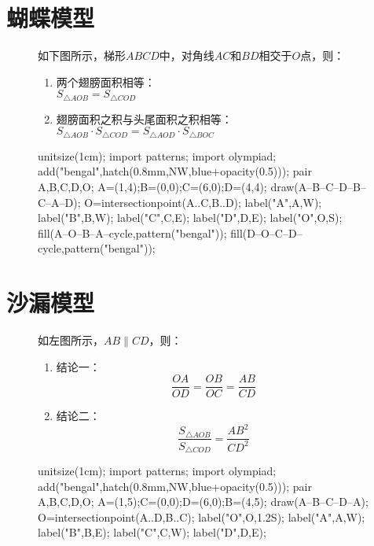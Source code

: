\documentclass[12pt,space]{ctexart} %
\begin{document}
\section{蝴蝶模型}
\begin{figure}[ht]
	\begin{minipage}[b]{0.5\textwidth}
		如下图所示，梯形$ABCD$中，对角线$AC$和$BD$相交于$O$点，则：
		\begin{enumerate}
			\item 两个翅膀面积相等：\\
			      $S_{\triangle AOB}=S_{\triangle COD}$
			\item 翅膀面积之积与头尾面积之积相等：\\
			      $S_{\triangle AOB}\cdot S_{\triangle COD}=S_{\triangle AOD}\cdot S_{\triangle BOC}$
		\end{enumerate}
	\end{minipage}
	\qquad
	\begin{minipage}[b]{0.4\textwidth}
		\begin{asy}
			unitsize(1cm);
			import patterns;
			import olympiad;
			add("bengal",hatch(0.8mm,NW,blue+opacity(0.5)));
			pair A,B,C,D,O;
			A=(1,4);B=(0,0);C=(6,0);D=(4,4);
			draw(A--B--C--D--B--C--A--D);
			O=intersectionpoint(A..C,B..D);
			label("A",A,W);
			label("B",B,W);
			label("C",C,E);
			label("D",D,E);
			label("O",O,S);
			fill(A--O--B--A--cycle,pattern("bengal"));
			fill(D--O--C--D--cycle,pattern("bengal"));
		\end{asy}
	\end{minipage}
\end{figure}
\vspace{1cm}
\section{沙漏模型}
\begin{figure}[ht]
	\begin{minipage}[b]{0.45\textwidth}
		如左图所示，$AB\parallel CD$，则：
		\begin{enumerate}
			\item 结论一：
			      \[
				      \frac{OA}{OD}=\frac{OB}{OC}=\frac{AB}{CD}
			      \]
			\item 结论二：
			      \[
				      \frac{S_{\triangle AOB}}{S_{\triangle COD}}=\frac{AB^2}{CD^2}
			      \]
		\end{enumerate}
	\end{minipage}
	\qquad
	\begin{minipage}[b]{0.45\textwidth}
		\begin{asy}
			unitsize(1cm);
			import patterns;
			import olympiad;
			add("bengal",hatch(0.8mm,NW,blue+opacity(0.5)));
			pair A,B,C,D,O;
			A=(1,5);C=(0,0);D=(6,0);B=(4,5);
			draw(A--B--C--D--A);
			O=intersectionpoint(A..D,B..C);
			label("O",O,1.2S);
			label("A",A,W);
			label("B",B,E);
			label("C",C,W);
			label("D",D,E);
		\end{asy}
	\end{minipage}
\end{figure}
\vspace{1cm}
\end{document}
